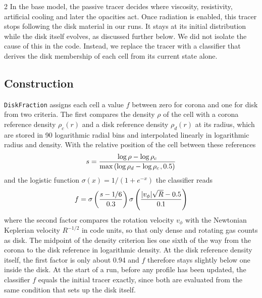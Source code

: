 \begin{multicols}{2}
	In the base model, the passive tracer decides where viscosity, resistivity, artificial cooling and later the opacities act.
	Once radiation is enabled, this tracer stops following the disk material in our runs. It stays at its initial distribution
	while the disk itself evolves, as discussed further below. We did not isolate the cause of this in the code. Instead, we
	replace the tracer with a classifier that derives the disk membership of each cell from its current state alone.

	\subsection{Construction}

	\texttt{DiskFraction} assigns each cell a value $f$ between zero for corona and one for disk from two criteria. The first compares the
	density $\rho$ of the cell with a corona reference density $\rho_c(r)$ and a disk reference density $\rho_d(r)$ at its radius,
	which are stored in \num{90} logarithmic radial bins and interpolated linearly in logarithmic radius and density. With the
	relative position of the cell between these references
	\begin{equation}
		s = \frac{\log \rho - \log \rho_c}{\max\left(\log \rho_d - \log \rho_c\kern+1pt, 0.5\right)}
	\end{equation}
	and the logistic function $\sigma(x) = 1 / \left(1 + e^{-x}\right)$ the classifier reads
	\begin{equation}
		f = \sigma\left(\frac{s - 1{\kern-0.5pt}/6}{0.3}\right) \sigma\left(\frac{\lvert v_\phi \rvert \sqrt{R} - 0.5}{0.{\kern-0.5pt}1}\right)
		\label{eq:diskfrac}
	\end{equation}
	where the second factor compares the rotation velocity $v_\phi$ with the Newtonian Keplerian velocity $R^{-1/2}$ in code units,
	so that only dense and rotating gas counts as disk. The midpoint of the density criterion lies one sixth of the way from the
	corona to the disk reference in logarithmic density. At the disk reference density itself, the first factor is only about
	\num{0.94} and $f$ therefore stays slightly below one inside the disk. At the start of a run, before any profile has been updated, the
	classifier $f$ equals the initial tracer exactly, since both are evaluated from the same condition that sets up the disk itself.


\end{multicols}
